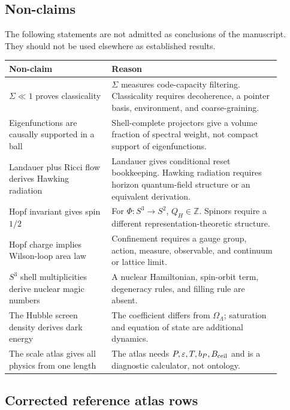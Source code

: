 \documentclass[11pt,a4paper]{article}
\begin{document}
\subsection{Non-claims}

The following statements are not admitted as conclusions of the manuscript.  They should not be used elsewhere as established results.

\begin{center}
\small
\begin{tabular}{p{0.34\linewidth}p{0.56\linewidth}}
\toprule
Non-claim & Reason\\
\midrule
\(\Sigma\ll1\) proves classicality & \(\Sigma\) measures code-capacity filtering.  Classicality requires decoherence, a pointer basis, environment, and coarse-graining.\\
Eigenfunctions are causally supported in a ball & Shell-complete projectors give a volume fraction of spectral weight, not compact support of eigenfunctions.\\
Landauer plus Ricci flow derives Hawking radiation & Landauer gives conditional reset bookkeeping.  Hawking radiation requires horizon quantum-field structure or an equivalent derivation.\\
Hopf invariant gives spin \(1/2\) & For \(\Phi:S^3\to S^2\), \(Q_H\in\mathbb Z\).  Spinors require a different representation-theoretic structure.\\
Hopf charge implies Wilson-loop area law & Confinement requires a gauge group, action, measure, observable, and continuum or lattice limit.\\
\(S^3\) shell multiplicities derive nuclear magic numbers & A nuclear Hamiltonian, spin-orbit term, degeneracy rules, and filling rule are absent.\\
The Hubble screen density derives dark energy & The coefficient differs from \(\Omega_\Lambda\); saturation and equation of state are additional dynamics.\\
The scale atlas gives all physics from one length & The atlas needs \(P,\varepsilon,T,b_P,B_{\rm ceil}\) and is a diagnostic calculator, not ontology.\\
\bottomrule
\end{tabular}
\end{center}

\subsection{Corrected reference atlas rows}
\end{document}
